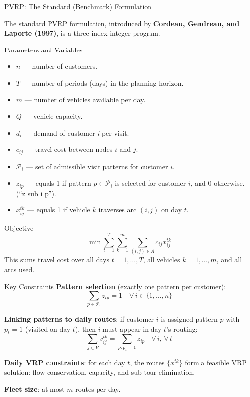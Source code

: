 \documentclass[aspectratio=169,10pt]{beamer}
\begin{document}
\begin{frame}[allowframebreaks]{PVRP: The Standard (Benchmark) Formulation}

The standard PVRP formulation, introduced by \textbf{Cordeau, Gendreau, and
Laporte (1997)}, is a three-index integer program.

\begin{block}{Parameters and Variables}
  \begin{itemize}
    \item $n$ --- number of customers.
    \item $T$ --- number of periods (days) in the planning horizon.
    \item $m$ --- number of vehicles available per day.
    \item $Q$ --- vehicle capacity.
    \item $d_i$ --- demand of customer $i$ per visit.
    \item $c_{ij}$ --- travel cost between nodes $i$ and $j$.
    \item $\mathcal{P}_i$ --- set of admissible visit patterns for customer $i$.
    \item $z_{ip}$ --- equals 1 if pattern $p \in \mathcal{P}_i$ is selected
          for customer $i$, and 0 otherwise.  (``z sub i p'').
    \item $x_{ij}^{tk}$ --- equals 1 if vehicle $k$ traverses arc $(i,j)$ on
          day $t$.
  \end{itemize}
\end{block}

\begin{block}{Objective}
  \[
    \min \sum_{t=1}^{T} \sum_{k=1}^{m} \sum_{(i,j)\in A} c_{ij} x_{ij}^{tk}
  \]
  This sums travel cost over all days $t = 1,\ldots,T$, all vehicles
  $k = 1,\ldots,m$, and all arcs used.
\end{block}

\framebreak

\begin{block}{Key Constraints}
  \textbf{Pattern selection} (exactly one pattern per customer):
  \[
    \sum_{p \in \mathcal{P}_i} z_{ip} = 1 \quad \forall\, i \in \{1,\ldots,n\}
  \]

  \textbf{Linking patterns to daily routes}: if customer $i$ is assigned
  pattern $p$ with $p_t = 1$ (visited on day $t$), then $i$ must appear in
  day $t$'s routing:
  \[
    \sum_{j \in V} x_{ij}^{tk} = \sum_{p: p_t=1} z_{ip} \quad \forall\, i,\, \forall\, t
  \]

  \textbf{Daily VRP constraints}: for each day $t$, the routes $\{x^{tk}\}$
  form a feasible VRP solution: flow conservation, capacity, and sub-tour
  elimination.

  \textbf{Fleet size}: at most $m$ routes per day.
\end{block}

\end{frame}
\end{document}

